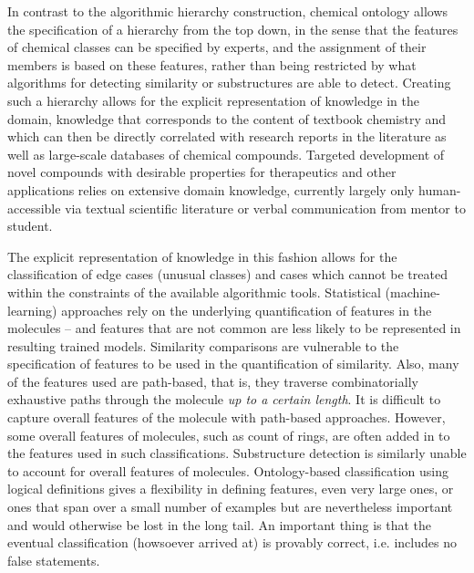 \documentclass[10pt]{bmc_article}
\newenvironment{bmcformat}{\baselineskip20pt\sloppy\setboolean{publ}{false}}{\baselineskip20pt\sloppy}
\begin{document}
\begin{bmcformat}
In contrast to the algorithmic hierarchy construction, chemical ontology allows the specification of a hierarchy from the top down, in the sense that the features of chemical classes can be specified by experts, and the assignment of their members is based on these features, rather than being restricted by what algorithms for detecting similarity or substructures are able to detect. Creating such a hierarchy allows for the explicit representation of knowledge in the domain, knowledge that corresponds to the content of textbook chemistry and which can then be directly correlated with research reports in the literature as well as large-scale databases of chemical compounds. Targeted development of novel compounds with desirable properties for therapeutics and other applications relies on extensive domain knowledge, currently largely only human-accessible via textual scientific literature or verbal communication from mentor to student. 

The explicit representation of knowledge in this fashion allows for the classification of edge cases (unusual classes)
 and cases which cannot be treated within the constraints of the available algorithmic tools. %
 Statistical (machine-learning) approaches rely on the underlying quantification of features in the molecules -- and features that are not common are less likely %
 to be represented in resulting trained models. Similarity comparisons are vulnerable to the specification of features to be used in the quantification of similarity.  
Also, many of the features used are path-based, that is, they traverse combinatorially exhaustive paths through the molecule \textit{up to a certain length}.  It is difficult to capture overall features of the molecule with path-based approaches.  However, some overall features of molecules, such as count of rings, are often added in to the features used in such classifications. Substructure detection is similarly unable to account for overall features of molecules.  %
Ontology-based classification using logical definitions gives a flexibility in defining features, even very large ones, or ones that span over a small number of examples but are nevertheless important and would otherwise be lost in the long tail.  An important thing is that the eventual classification (howsoever arrived at) is provably correct, i.e. includes no false statements. 


\end{bmcformat}
\end{document}
